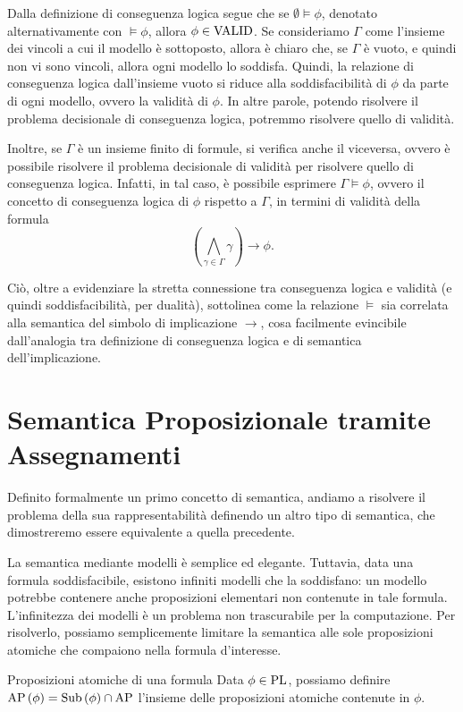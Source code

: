 Dalla definizione di conseguenza logica segue che se \(\emptyset \models \phi\), denotato alternativamente con \(\models \phi\), allora \(\phi\in\Valid\).
Se consideriamo \(\Gamma\) come l'insieme dei vincoli a cui il modello è sottoposto, allora è chiaro che, se \(\Gamma\) è vuoto, e quindi non vi sono vincoli, allora ogni modello lo soddisfa.
Quindi, la relazione di conseguenza logica dall'insieme vuoto si riduce alla soddisfacibilità di \(\phi\) da parte di ogni modello, ovvero la validità di \(\phi\).
In altre parole, potendo risolvere il problema decisionale di conseguenza logica, potremmo risolvere quello di validità.

Inoltre, se \(\Gamma\) è un insieme finito di formule, si verifica anche il viceversa, ovvero è possibile risolvere il problema decisionale di validità per risolvere quello di conseguenza logica. Infatti, in tal caso, è possibile esprimere \(\Gamma \models \phi\), ovvero il concetto di conseguenza logica di \(\phi\) rispetto a \(\Gamma\), in termini di validità della formula
\[\left(\bigwedge_{\gamma \in \Gamma} \gamma\right) \rightarrow \phi.\]

Ciò, oltre a evidenziare la stretta connessione tra conseguenza logica e validità (e quindi soddisfacibilità, per dualità), sottolinea come la relazione \(\models\) sia correlata alla semantica del simbolo di implicazione \(\rightarrow\), cosa facilmente evincibile dall'analogia tra definizione di conseguenza logica e di semantica dell'implicazione.

\section{Semantica Proposizionale tramite Assegnamenti}

Definito formalmente un primo concetto di semantica, andiamo a risolvere il problema della sua rappresentabilità definendo un altro tipo di semantica, che dimostreremo essere equivalente a quella precedente.

La semantica mediante modelli è semplice ed elegante. 
Tuttavia, data una formula soddisfacibile, esistono infiniti modelli che la soddisfano: un modello potrebbe contenere anche proposizioni elementari non contenute in tale formula.
L'infinitezza dei modelli è un problema non trascurabile per la computazione.
Per risolverlo, possiamo semplicemente limitare la semantica alle sole proposizioni atomiche che compaiono nella formula d'interesse.

\begin{definition}{Proposizioni atomiche di una formula}
  Data \(\phi \in \operatorname{PL}\), possiamo definire \(\AP[\phi] = \Sub{\phi} \cap \AP\) l'insieme delle proposizioni atomiche contenute in \(\phi\).
\end{definition}

